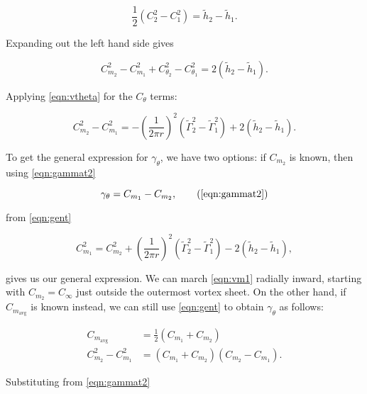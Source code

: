 \begin{equation}
    \frac{1}{2} \left(C_2^2 - C_1^2 \right) = \widetilde{h}_2 - \widetilde{h}_1.
\end{equation}

\noindent Expanding out the left hand side gives

\begin{equation}
    C_{m_2}^2 - C_{m_1}^2 + C_{\theta_2}^2 - C_{\theta_1}^2 = 2 \left( \widetilde{h}_2 - \widetilde{h}_1 \right).
\end{equation}

\noindent Applying \cref{eqn:vtheta} for the \(C_\theta\) terms:

\begin{equation}
    \label{eqn:gent}
    C_{m_2}^2 - C_{m_1}^2 = -\left(\frac{1}{2 \pi r}\right)^2 \left(\widetilde{\Gamma}_2^2-\widetilde{\Gamma}_1^2\right) + 2 \left( \widetilde{h}_2 - \widetilde{h}_1 \right).
\end{equation}

To get the general expression for \(\gamma_\theta\), we have two options: if \(C_{m_2}\) is known, then using \cref{eqn:gammat2}

\begin{equation}
    \gamma_\theta = C_{m_1} - C_{m_2},
     \tag{\ref{eqn:gammat2}}
\end{equation}

\where from \cref{eqn:gent}

\begin{equation}
\label{eqn:vm1}
    C_{m_1}^2 = C_{m_2}^2 + \left(\frac{1}{2 \pi r}\right)^2 \left(\widetilde{\Gamma}_2^2-\widetilde{\Gamma}_1^2\right) - 2 \left( \widetilde{h}_2 - \widetilde{h}_1 \right),
\end{equation}

\noindent gives us our general expression.
We can march \cref{eqn:vm1} radially inward, starting with \(C_{m_2} = C_\infty\) just outside the outermost vortex sheet.
%
On the other hand, if \(C_{m_\text{avg}}\) is known instead, we can still use \cref{eqn:gent} to obtain \(\gamma_\theta\) as follows:

\begin{align}
    \label{eqn:vmavg}
    C_{m_\text{avg}} &= \frac{1}{2}\left(C_{m_1} + C_{m_2}\right) \\
    C_{m_2}^2 - C_{m_1}^2 &= \left(C_{m_1} + C_{m_2}\right)\left(C_{m_2} - C_{m_1}\right).
\end{align}

\noindent Substituting from \cref{eqn:gammat2}

